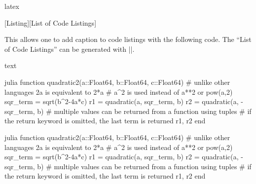 \documentclass[letterpaper, 11pt, DIV=11]{scrartcl}
\newenvironment{mylisting}{\medskip\captionsetup{type=listing, labelsep=colon}}{\medskip}
\begin{document}
\begin{tcbsrccode}{latex}
\usepackage{caption}

\newenvironment{mylisting}{\medskip\captionsetup{type=listing, labelsep=space}}{\medskip}
[Listing][List of Code Listings]
\end{tcbsrccode}

This allows one to add caption to code listings with the following code. The ``List of Code Listings'' can be generated with \texinline|\listoflstcaps|.

\begin{tcbsrccode}{text}
\begin{mylisting}
\begin{tcbcode*}{julia}
function quadratic2(a::Float64, b::Float64, c::Float64)
    # unlike other languages 2a is equivalent to 2*a
    # a^2 is used instead of a**2 or pow(a,2)
    sqr_term = sqrt(b^2-4a*c)
    r1 = quadratic(a, sqr_term, b)
    r2 = quadratic(a, -sqr_term, b)
    # multiple values can be returned from a function using tuples
    # if the return keyword is omitted, the last term is returned
    r1, r2
end
\end{tcbcode*}
\end{mylisting}
\listoflstcaps
\end{tcbsrccode}

\begin{mylisting}
\begin{tcbcode*}{julia}
function quadratic2(a::Float64, b::Float64, c::Float64)
    # unlike other languages 2a is equivalent to 2*a
    # a^2 is used instead of a**2 or pow(a,2)
    sqr_term = sqrt(b^2-4a*c)
    r1 = quadratic(a, sqr_term, b)
    r2 = quadratic(a, -sqr_term, b)
    # multiple values can be returned from a function using tuples
    # if the return keyword is omitted, the last term is returned
    r1, r2
end
\end{tcbcode*}
\end{mylisting}
\listoflstcaps
\end{document}
